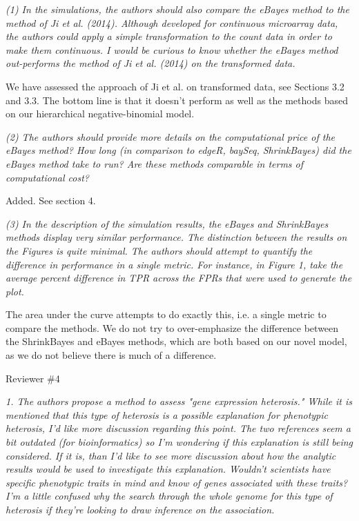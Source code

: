 \documentclass{article}
\newcommand{\comment}[1]{\textit{#1}}
\newcommand{\response}[1]{#1}
\begin{document}
\comment{(1) In the simulations, the authors should also compare the eBayes method to the method of Ji et al. (2014). Although developed for continuous microarray data, the authors could apply a simple transformation to the count data in order to make them continuous. I would be curious to know whether the eBayes method out-performs the method of Ji et al. (2014) on the transformed data.}

\response{We have assessed the approach of Ji et al. on transformed data, see Sections 3.2 and 3.3. The bottom line is that it doesn't perform as well as the methods based on our hierarchical negative-binomial model.}

\comment{(2) The authors should provide more details on the computational price of the eBayes method? How long (in comparison to edgeR, baySeq, ShrinkBayes) did the eBayes method take to run? Are these methods comparable in terms of computational cost?}

\response{Added. See section 4.}

\comment{(3) In the description of the simulation results, the eBayes and ShrinkBayes methods display very similar performance. The distinction between the results on the Figures is quite minimal. The authors should attempt to quantify the difference in performance in a single metric. For instance, in Figure 1, take the average percent difference in TPR across the FPRs that were used to generate the plot.}

\response{The area under the curve attempts to do exactly this, i.e. a single metric to compare the methods. We do not try to over-emphasize the difference between the ShrinkBayes and eBayes methods, which are both based on our novel model, as we do not believe there is much of a difference.}



Reviewer \#4

\comment{1. The authors propose a method to assess "gene expression heterosis."   While it is mentioned that this type of heterosis is a possible explanation for phenotypic heterosis, I'd like more discussion regarding this point.  The two references seem a bit outdated (for bioinformatics) so I'm wondering if this explanation is still being considered.  If it is, than I'd like to see more discussion about how the analytic results would be used to investigate this explanation.   Wouldn't scientists have specific phenotypic traits in mind and know of genes associated with these traits?  I'm a little confused why the search through the whole genome for this type of heterosis if they're looking to draw inference on the association.}
\end{document}
